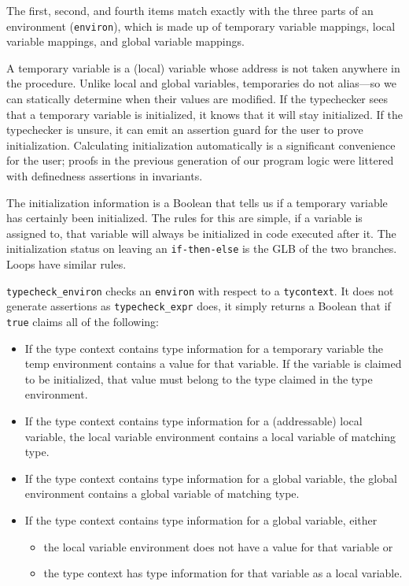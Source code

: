 \documentclass{puthesis}
\begin{document}
The first, second, and fourth items match exactly with the three parts of
an environment (\lstinline|environ|), which is made up of temporary variable
mappings, local variable mappings, and global variable mappings.

A temporary variable is a (local) variable whose address is not taken anywhere
in the procedure. 
Unlike local and global variables,
temporaries do not alias---so we can statically determine when their
values are modified. If the typechecker sees that a temporary
variable is initialized, it knows that it will stay initialized. If the
typechecker is unsure, it can emit an assertion guard for the user to prove
initialization. Calculating initialization automatically 
is a significant convenience for the user; proofs in the previous generation of
our program logic were littered with definedness assertions in invariants.

The initialization information is a Boolean that tells us if a
temporary variable has certainly been initialized. The rules for this are
simple, if a variable is assigned to, that variable will always be initialized
in code executed after it. 
The initialization status on leaving an \lstinline|if-then-else|
is the GLB of the two branches. Loops have similar rules.


\lstinline|typecheck_environ| checks an \lstinline|environ| with respect to
a \lstinline|tycontext|. 
It does not generate assertions as
\lstinline|typecheck_expr| does, it simply returns a Boolean
that if \lstinline{true} claims all of the following:
\begin{itemize}
  \item If the type context contains type information for a temporary variable
  the temp environment contains a value for that variable. If
  the variable is claimed to be initialized, that value
  must belong to the type claimed in the type environment.
  \item If the type context contains type information for a (addressable) local
  variable, the local variable environment contains a local variable of matching type.
  \item If the type context contains type information for a global variable, the
  global environment contains a global variable of matching type.
  \item If the type context contains type information for a global variable,
  either
     \begin{itemize}
       \item the local variable environment does not have a value for that
       variable or
       \item the type context has type information for that variable as a local
       variable.
       \end{itemize}
\end{itemize}
\end{document}
